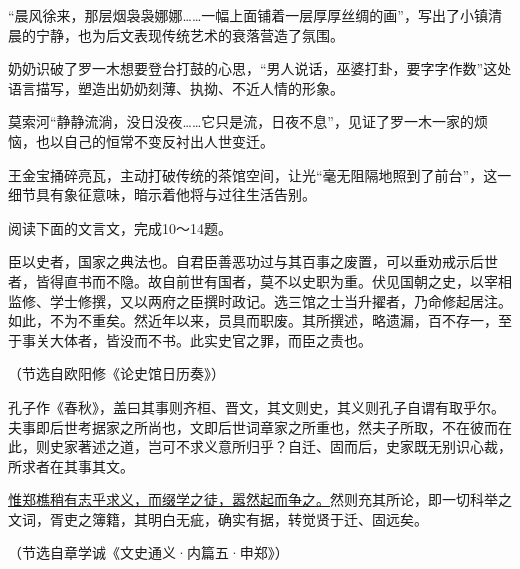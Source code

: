 \documentclass[11pt,a4paper]{ctexart}
\begin{document}
\begin{choices}
\item “晨风徐来，那层烟袅袅娜娜……一幅上面铺着一层厚厚丝绸的画”，写出了小镇清晨的宁静，也为后文表现传统艺术的衰落营造了氛围。
\item 奶奶识破了罗一木想要登台打鼓的心思，“男人说话，巫婆打卦，要字字作数”这处语言描写，塑造出奶奶刻薄、执拗、不近人情的形象。
\item 莫索河“静静流淌，没日没夜……它只是流，日夜不息”，见证了罗一木一家的烦恼，也以自己的恒常不变反衬出人世变迁。
\item 王金宝捅碎亮瓦，主动打破传统的茶馆空间，让光“毫无阻隔地照到了前台”，这一细节具有象征意味，暗示着他将与过往生活告别。
\end{choices}


\par\vspace{2.2em}


\par\vspace{2.2em}


\par\vspace{2.2em}

阅读下面的文言文，完成10～14题。

\begin{materialtext}
臣以史者，国家之典法也。自君臣善恶功过与其百事之废置，可以垂劝戒示后世者，皆得直书而不隐。故自前世有国者，莫不以史职为重。伏见国朝之史，以宰相监修、学士修撰，又以两府之臣撰时政记。选三馆之士当升擢者，乃命修起居注。如此，不为不重矣。然近年以来，员具而职废。其所撰述，略遗漏，百不存一，至于事关大体者，皆没而不书。此实史官之罪，而臣之责也。
\end{materialtext}
\begin{flushright}（节选自欧阳修《论史馆日历奏》）\end{flushright}

\begin{materialtext}
孔子作《春秋》，盖曰其事则齐桓、晋文，其文则史，其义则孔子自谓有取乎尔。夫事即后世考据家之所尚也，文即后世词章家之所重也，然夫子所取，不在彼而在此，则史家著述之道，岂可不求义意所归乎？自迁、固而后，史家既无别识心裁，所求者在其事其文。

\uline{惟郑樵稍有志乎求义，而缀学之徒，嚣然起而争之。}然则充其所论，即一切科举之文词，胥吏之簿籍，其明白无疵，确实有据，转觉贤于迁、固远矣。
\end{materialtext}
\begin{flushright}（节选自章学诚《文史通义·内篇五·申郑》）\end{flushright}
\end{document}
